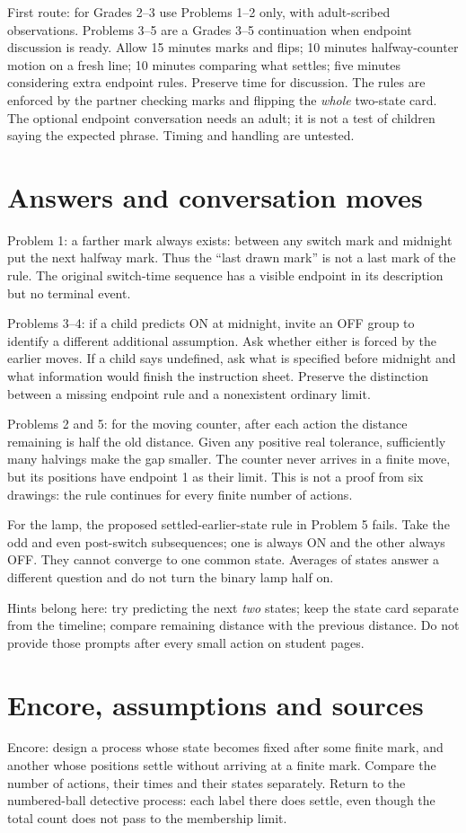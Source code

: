 \documentclass[11pt,letterpaper]{article}
\begin{document}
First route: for Grades 2--3 use Problems 1--2 only, with adult-scribed observations. Problems 3--5 are a Grades 3--5 continuation when endpoint discussion is ready. Allow 15 minutes marks and flips; 10 minutes halfway-counter motion on a fresh line; 10 minutes comparing what settles; five minutes considering extra endpoint rules. Preserve time for discussion. The rules are enforced by the partner checking marks and flipping the \emph{whole} two-state card. The optional endpoint conversation needs an adult; it is not a test of children saying the expected phrase. Timing and handling are untested.
\newpage
\section*{Answers and conversation moves}
Problem 1: a farther mark always exists: between any switch mark and midnight put the next halfway mark. Thus the ``last drawn mark'' is not a last mark of the rule. The original switch-time sequence has a visible endpoint in its description but no terminal event.

Problems 3--4: if a child predicts ON at midnight, invite an OFF group to identify a different additional assumption. Ask whether either is forced by the earlier moves. If a child says undefined, ask what is specified before midnight and what information would finish the instruction sheet. Preserve the distinction between a missing endpoint rule and a nonexistent ordinary limit.

Problems 2 and 5: for the moving counter, after each action the distance remaining is half the old distance. Given any positive real tolerance, sufficiently many halvings make the gap smaller. The counter never arrives in a finite move, but its positions have endpoint 1 as their limit. This is not a proof from six drawings: the rule continues for every finite number of actions.

For the lamp, the proposed settled-earlier-state rule in Problem 5 fails. Take the odd and even post-switch subsequences; one is always ON and the other always OFF. They cannot converge to one common state. Averages of states answer a different question and do not turn the binary lamp half on.

Hints belong here: try predicting the next \emph{two} states; keep the state card separate from the timeline; compare remaining distance with the previous distance. Do not provide those prompts after every small action on student pages.
\newpage
\section*{Encore, assumptions and sources}
Encore: design a process whose state becomes fixed after some finite mark, and another whose positions settle without arriving at a finite mark. Compare the number of actions, their times and their states separately. Return to the numbered-ball detective process: each label there does settle, even though the total count does not pass to the membership limit.
\end{document}
